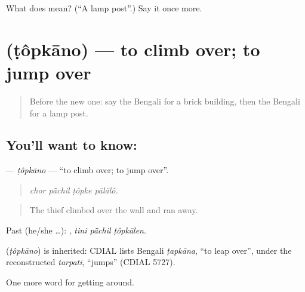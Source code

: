 \begin{tcolorbox}[breakable,colback=teal!4,colframe=teal!35!black,title={Before you move on}]
What does  mean? (\textquotedblleft{}A lamp post\textquotedblright{}.) Say it once more.
\end{tcolorbox}
\section[\texorpdfstring{\bn{টপকানো} (ṭôpkāno)}{টপকানো (ṭôpkāno)}]{ (ṭôpkāno) — to climb over; to jump over}

\label{lesson:BN-C412-topkano}



\begin{quote}
Before the new one: say the Bengali for a brick building, then the Bengali for a lamp post.
\end{quote}

\subsection*{You'll want to know: }
\textbf{} — \emph{ṭôpkāno} — \textquotedblleft{}to climb over; to jump over\textquotedblright{}.

\begin{quote}
   
\end{quote}

\begin{quote}
\emph{chor pā̃chil ṭôpke pālālô.}
\end{quote}

\begin{quote}
The thief climbed over the wall and ran away.
\end{quote}

Past (he/she …):   , \emph{tini pā̃chil ṭôpkālen}.

\begin{cousinweb}
\textbf{} (\emph{ṭôpkāno}) is inherited: CDIAL lists Bengali \emph{ṭapkāna}, \textquotedblleft{}to leap over\textquotedblright{}, under the reconstructed \emph{tarpati}, \textquotedblleft{}jumps\textquotedblright{} (CDIAL 5727).
\end{cousinweb}

\begin{grammarlens}[title={What you've built}]
One more word for getting around.
\end{grammarlens}

